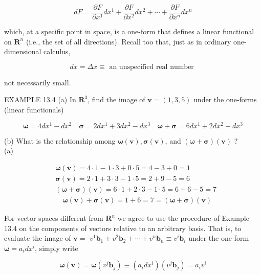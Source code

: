\documentclass[10pt]{article}
\begin{document}
$$
d F=\frac{\partial F}{\partial x^{1}} d x^{1}+\frac{\partial F}{\partial x^{2}} d x^{2}+\cdots+\frac{\partial F}{\partial x^{n}} d x^{n}
$$

which, at a specific point in space, is a one-form that defines a linear functional on $\mathbf{R}^{n}$ (i.e., the set of all directions). Recall too that, just as in ordinary one-dimensional calculus,

$$
d x=\Delta x \equiv \text { an unspecified real number }
$$

not necessarily small.

EXAMPLE 13.4 (a) In $\mathbf{R}^{3}$, find the image of $\mathbf{v}=(1,3,5)$ under the one-forms (linear functionals)

$$
\boldsymbol{\omega}=4 d x^{1}-d x^{2} \quad \boldsymbol{\sigma}=2 d x^{1}+3 d x^{2}-d x^{3} \quad \boldsymbol{\omega}+\boldsymbol{\sigma}=6 d x^{1}+2 d x^{2}-d x^{3}
$$

(b) What is the relationship among $\boldsymbol{\omega}(\mathbf{v}), \boldsymbol{\sigma}(\mathbf{v})$, and $(\boldsymbol{\omega}+\boldsymbol{\sigma})(\mathbf{v})$ ?\\
(a)


\begin{align*}
& \boldsymbol{\omega}(\mathbf{v})=4 \cdot 1-1 \cdot 3+0 \cdot 5=4-3+0=1 \\
& \boldsymbol{\sigma}(\mathbf{v})=2 \cdot 1+3 \cdot 3-1 \cdot 5=2+9-5=6 \\
& (\boldsymbol{\omega}+\boldsymbol{\sigma})(\mathbf{v})=6 \cdot 1+2 \cdot 3-1 \cdot 5=6+6-5=7 \\
& \quad \boldsymbol{\omega}(\mathbf{v})+\boldsymbol{\sigma}(\mathbf{v})=1+6=7=(\boldsymbol{\omega}+\boldsymbol{\sigma})(\mathbf{v}) \tag{b}
\end{align*}


For vector spaces different from $\mathbf{R}^{n}$ we agree to use the procedure of Example 13.4 on the components of vectors relative to an arbitrary basis. That is, to evaluate the image of $\mathbf{v}=$ $v^{1} \mathbf{b}_{1}+v^{2} \mathbf{b}_{2}+\cdots+v^{n} \mathbf{b}_{n} \equiv v^{i} \mathbf{b}_{i}$ under the one-form $\boldsymbol{\omega}=a_{i} d x^{i}$, simply write


\begin{equation*}
\boldsymbol{\omega}(\mathbf{v})=\boldsymbol{\omega}\left(v^{j} \mathbf{b}_{j}\right) \equiv\left(a_{i} d x^{i}\right)\left(v^{j} \mathbf{b}_{j}\right)=a_{i} v^{i} \tag{13.2}
\end{equation*}
\end{document}
